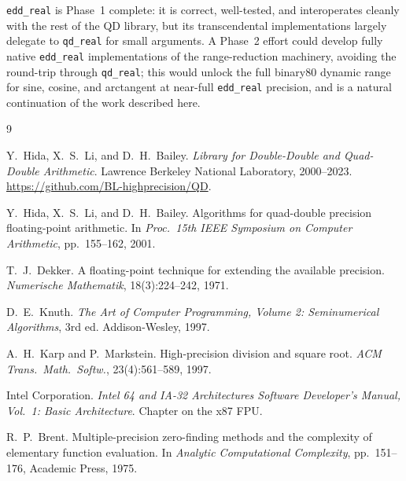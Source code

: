 \documentclass[11pt,a4paper]{article}
\begin{document}
\texttt{edd\_real} is Phase~1 complete: it is correct, well-tested,
and interoperates cleanly with the rest of the QD library, but its
transcendental implementations largely delegate to
\texttt{qd\_real} for small arguments.  A Phase~2 effort could
develop fully native \texttt{edd\_real} implementations of the
range-reduction machinery, avoiding the round-trip through
\texttt{qd\_real}; this would unlock the full binary80 dynamic
range for sine, cosine, and arctangent at near-full
\texttt{edd\_real} precision, and is a natural continuation of the
work described here.

\begin{thebibliography}{9}

Y.~Hida, X.~S.~Li, and D.~H.~Bailey.
\emph{Library for Double-Double and Quad-Double Arithmetic}.
Lawrence Berkeley National Laboratory, 2000--2023.
\url{https://github.com/BL-highprecision/QD}.

Y.~Hida, X.~S.~Li, and D.~H.~Bailey.
Algorithms for quad-double precision floating-point arithmetic.
In \emph{Proc.\ 15th IEEE Symposium on Computer Arithmetic},
pp.\ 155--162, 2001.

T.~J.~Dekker.
A floating-point technique for extending the available precision.
\emph{Numerische Mathematik}, 18(3):224--242, 1971.

D.~E.~Knuth.
\emph{The Art of Computer Programming, Volume 2: Seminumerical
Algorithms}, 3rd ed.
Addison-Wesley, 1997.

A.~H.~Karp and P.~Markstein.
High-precision division and square root.
\emph{ACM Trans.\ Math.\ Softw.}, 23(4):561--589, 1997.

Intel Corporation.
\emph{Intel 64 and IA-32 Architectures Software Developer's
Manual, Vol.\ 1: Basic Architecture}.  Chapter on the x87 FPU.

R.~P.~Brent.
Multiple-precision zero-finding methods and the complexity of
elementary function evaluation.
In \emph{Analytic Computational Complexity}, pp.\ 151--176,
Academic Press, 1975.

\end{thebibliography}
\end{document}
